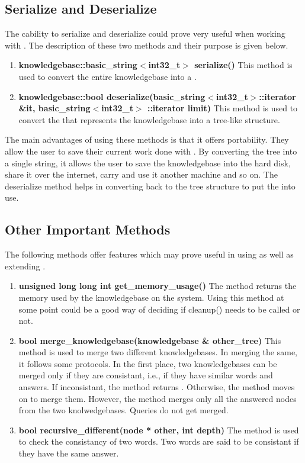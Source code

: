 \subsection*{Serialize and Deserialize}
	The cability to serialize and deserialize could prove very useful when working with \libalf. The description of these two methods and their purpose is given below.
	
\begin{enumerate}
\item \textbf{knowledgebase::basic\_string$<$int32\_t$>$ serialize()} \hfill \vskip 1pt
	This method is used to convert the entire knowledgebase into a \stringtype. 
\item \textbf{knowledgebase::bool deserialize(basic\_string$<$int32\_t$>$::iterator \&it, basic\_string$<$int32\_t$>$ ::iterator limit)} \hfill \vskip 1pt
	This method is used to convert the \stringtype that represents the knowledgebase into a tree-like structure.
\end{enumerate}	
	The main advantages of using these methods is that it offers portability. They allow the user to save their current work done with \libalf. By converting the tree into a single string, it allows the user to save the knowledgebase into the hard disk, share it over the internet, carry and use it another machine and so on. The deserialize method helps in converting back to the tree structure to put the \libalf into use.

\subsection*{Other Important Methods}
	The following methods offer features which may prove useful in using as well as extending \libalf.
\begin{enumerate}
\item \textbf{unsigned long long int get\_memory\_usage()} \vskip 1pt
	The method returns the memory used by the knowledgebase on the system. Using this method at some point could be a good way of deciding if cleanup() needs to be called or not. 
		
\item \textbf{bool merge\_knowledgebase(knowledgebase \& other\_tree)} \vskip 1pt
	This method is used to merge two different knowledgebases. In merging the same, it follows some protocols. In the first place, two knowledgebases can be merged only if they are consistant, i.e., if they have similar words and answers. If inconsistant, the method returns \false. Otherwise, the method moves on to merge them. However, the method merges only all the answered nodes from the two knolwedgebases. Queries do not get merged. 

\item \textbf{bool recursive\_different(node * other, int depth)} \vskip 1pt
	The method is used to check the consistancy of two words. Two words are said to be consistant if they have the same answer. 
\end{enumerate}



